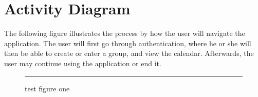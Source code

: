 \chapter{Activity Diagram}
The following figure illustrates the process by how the user will navigate the application. The user will first go through authentication, where he or she will then be able to create or enter a group, and view the calendar. Afterwards, the user may continue using the application or end it.

\begin{figure}[!ht]
	\centering
	\rule{2cm}{2cm}
	\caption{test figure one}
	\label{Activity Diagram}
\end{figure}